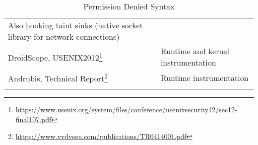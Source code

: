 \begin{longtable}{p{.3\linewidth}p{.7\linewidth}}
Also hooking taint sinks (native socket library for network connections)
\\

DroidScope, USENIX2012\footnote{\url{https://www.usenix.org/system/files/conference/usenixsecurity12/sec12-final107.pdf}}
& Runtime and kernel instrumentation
\\

Andrubis, Technical Report\footnote{\url{https://www.vvdveen.com/publications/TR0414001.pdf}}
& Runtime instrumentation
\\

\midrule
\caption{Permission Denied Syntax} 
\label{tab:permissiondeniedsyntax}
\end{longtable}

\pagebreak